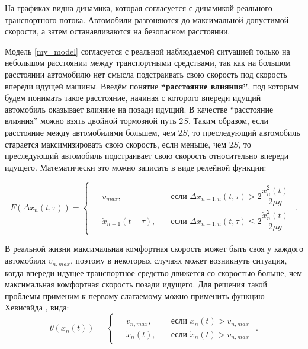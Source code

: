 \documentclass[12pt, a4paper]{extarticle}
\numberwithin{equation}{section}
\begin{document}
На графиках видна динамика, которая согласуется с динамикой реального транспортного потока. Автомобили разгоняются до максимальной допустимой скорости, а затем останавливаются на безопасном расстоянии. 

Модель \eqref{my_model} согласуется с реальной наблюдаемой ситуацией только на небольшом расстоянии между транспортными средствами, так как на большом расстоянии автомобилю нет смысла подстраивать свою скорость под скорость впереди идущей машины. Введём понятие \textbf{``расстояние влияния''}, под которым будем понимать такое расстояние, начиная с которого впереди идущий автомобиль оказывает влияние на позади идущий. В качестве ``расстояние влияния'' можно взять двойной тормозной путь $2S$. Таким образом, если расстояние между автомобилями большем, чем  $2S$, то преследующий автомобиль старается максимизировать свою скорость, если меньше, чем  $2S$, то преследующий автомобиль подстраивает свою скорость относительно впереди идущего. Математически это можно записать в виде релейной функции:

\begin{equation*}
F(\Delta x_{n}(t,\tau))=
\begin{cases}
\begin{split}
&v_{max},\quad &\text{если }\Delta x_{n-1,n}(t,\tau) > 2\dfrac{\dot{x}_n^2(t)}{2\mu g} \\
&\dot{x}_{n-1}(t-\tau),\quad &\text{если }\Delta x_{n-1,n}(t,\tau) \leq 2\dfrac{\dot{x}_n^2(t)}{2\mu g}
\end{split}
\end{cases}.
\end{equation*}

В реальной жизни максимальная комфортная скорость может быть своя у каждого автомобиля $v_{n,max}$, поэтому в некоторых случаях может возникнуть ситуация, когда впереди идущее транспортное средство движется со скоростью больше, чем максимальная комфортная скорость позади идущего. Для решения такой проблемы применим к первому слагаемому можно применить функцию Хевисайда \cite{Heaviside_function}, вида:
\begin{equation*}
\theta(\dot{x}_n(t))=
\begin{cases}
\begin{split}
&v_{n,max},\quad &\text{если }\dot{x}_n(t)>v_{n,max} \\
&\dot{x}_n(t),\quad &\text{если }\dot{x}_n(t)>v_{n,max}
\end{split}
\end{cases}.
\end{equation*}
\end{document}
